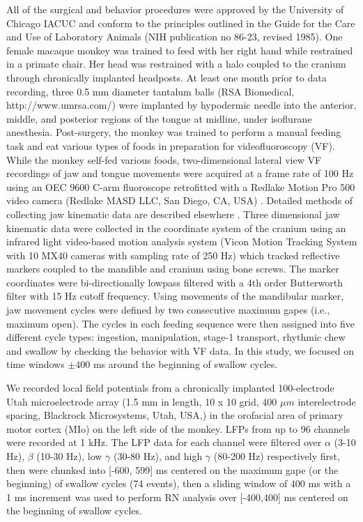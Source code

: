 \documentclass[letterpaper, 9pt, conference]{ieeeconf}
\begin{document}
All of the surgical and behavior procedures were approved by the University of Chicago IACUC and conform to the principles outlined in the Guide for the Care and Use of Laboratory Animals (NIH publication no 86-23, revised 1985). One female macaque monkey was trained to feed with her right hand while restrained in a primate chair. Her head was restrained with a halo coupled to the cranium through chronically implanted headposts. At least one month prior to data recording, three 0.5 mm diameter tantalum balls (RSA Biomedical, http://www.umrsa.com/) were implanted by hypodermic needle into the anterior, middle, and posterior regions of the tongue at midline, under isoflurane anesthesia. Post-surgery, the monkey was trained to perform a manual feeding task and eat various types of foods in preparation for videofluoroscopy (VF). While the monkey self-fed various foods, two-dimensional lateral view VF recordings of jaw and tongue movements were acquired at a frame rate of 100 Hz using an OEC 9600 C-arm fluoroscope retrofitted with a  Redlake  Motion  Pro  500  video  camera (Redlake MASD LLC, San Diego, CA, USA)  \cite{Callum2010a}. Detailed methods of collecting jaw kinematic data are described elsewhere  \cite{Reed2011,pepe2011}. Three dimensional jaw kinematic data were collected in the coordinate system of the cranium using an infrared light video-based motion analysis system (Vicon Motion Tracking System with 10 MX40 cameras with sampling rate of 250 Hz) which tracked reflective markers coupled to the mandible and cranium using bone screws. The marker coordinates were bi-directionally lowpass filtered with a 4th order Butterworth filter with 15 Hz cutoff frequency. Using movements of the mandibular marker, jaw movement cycles were defined by two consecutive maximum gapes (i.e., maximum open). The cycles in each feeding sequence were then assigned into five different cycle types: ingestion, manipulation, stage-1 transport, rhythmic chew and swallow \cite{Thexton1980} by checking the behavior with VF data. In this study, we focused on time windows $\pm 400$ ms around the beginning of swallow cycles. 



We recorded local field potentials from a chronically implanted 100-electrode Utah microelectrode array (1.5 mm in length, 10 x 10 grid, 400 $\mu m$ interelectrode spacing, Blackrock Microsystems, Utah, USA,) in the orofacial area of primary motor cortex (MIo) on the left side of the monkey. LFPs from up to 96 channels were recorded at 1 kHz. The LFP data for each channel were filtered over $\alpha$ (3-10 Hz), $\beta$ (10-30 Hz), low $\gamma$ (30-80 Hz), and high $\gamma$ (80-200 Hz) respectively first, then were chunked into [-600, 599] ms centered on the maximum gape (or the beginning) of swallow cycles (74 events), then a sliding window of $400$ ms with a 1 ms increment was used to perform RN analysis over [-400,400] ms centered on the beginning of swallow cycles. 
\end{document}
